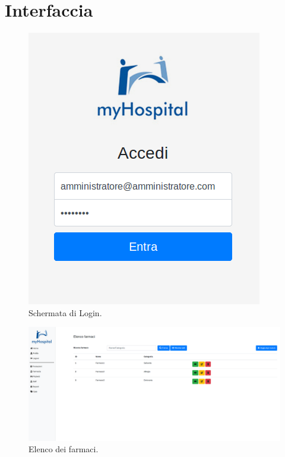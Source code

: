 \documentclass[paper=a4, fontsize=11pt,x11names]{report}
\begin{document}
\chapter{Interfaccia}

\begin{figure}[H]
\begin{center}
\includegraphics[scale=1]{grafica/Login}
\caption{Schermata di Login.}
\end{center}
\end{figure}

\begin{landscape}
\begin{figure}[H]
\begin{center}
\includegraphics[scale=0.6]{grafica/ElencoFarmaci}
\caption{Elenco dei farmaci.}
\end{center}
\end{figure}
\end{landscape}
\end{document}
